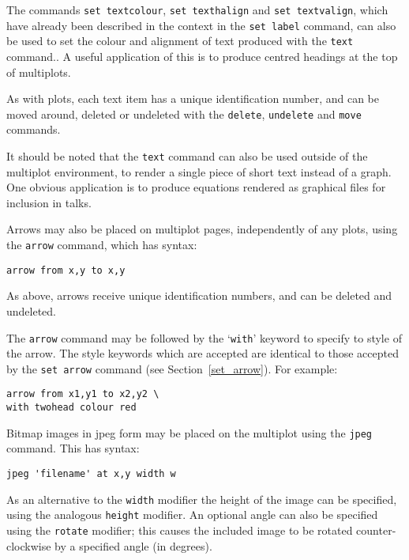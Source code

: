 The commands {\tt set textcolour}, {\tt set
texthalign} and {\tt set textvalign}, which have already been described in
the context in the {\tt set label} command, can also be used to set the
colour and alignment of text produced with the {\tt text} command.. A useful application of this is to
produce centred headings at the top of multiplots.

As with plots, each text item has a unique identification number, and can be
moved around, deleted or undeleted with the {\tt delete}, {\tt undelete}
and {\tt move} commands.

It should be noted that the {\tt text} command can also be used outside of
the multiplot environment, to render a single piece of short text instead of a
graph. One obvious application is to produce equations rendered as graphical
files for inclusion in talks.

\label{arrows}  Arrows may also be
placed on multiplot pages, independently of any plots, using the {\tt arrow}
command, which has syntax:

\begin{verbatim} 
arrow from x,y to x,y
\end{verbatim}

As above, arrows receive unique identification numbers, and can be deleted and
undeleted.

The {\tt arrow} command may be followed by the `{\tt with}' keyword to
specify to style of the arrow. The style keywords which are accepted are
identical to those accepted by the {\tt set arrow} command (see
Section~\ref{set_arrow}). For example:

\begin{verbatim} 
arrow from x1,y1 to x2,y2 \
with twohead colour red
\end{verbatim}

 Bitmap images in jpeg form may be
placed on the multiplot using the {\tt jpeg} command.  This has syntax:

\begin{verbatim}
jpeg 'filename' at x,y width w
\end{verbatim}

As an alternative to the {\tt width} modifier the height of the image can be
specified, using the analogous {\tt height} modifier.  An optional angle can
also be specified using the {\tt rotate} modifier; this causes the included
image to be rotated counter-clockwise by a specified angle (in degrees).

